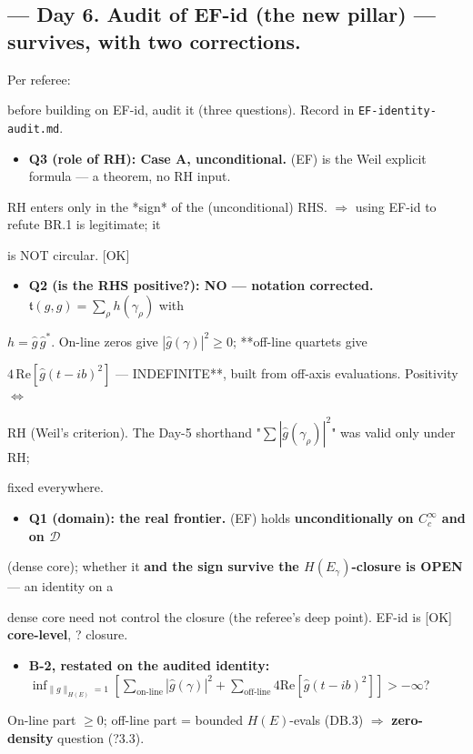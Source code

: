 \documentclass[10pt]{article}
\begin{document}
\subsection*{ --- Day 6. Audit of EF-id (the new pillar) --- survives, with two corrections.}
Per referee:\par
before building on EF-id, audit it (three questions). Record in \texttt{EF-identity-audit.md}.\par
\begin{itemize}
\item \textbf{Q3 (role of RH): Case A, unconditional.} (EF) is the Weil explicit formula --- a theorem, no RH input.
\end{itemize}
  RH enters only in the *sign* of the (unconditional) RHS. \ensuremath{\Rightarrow} using EF-id to refute BR.1 is legitimate; it\par
  is NOT circular. [OK]\par
\begin{itemize}
\item \textbf{Q2 (is the RHS positive?): NO --- notation corrected.} $\mathfrak t(g,g)=\sum_\rho h(\gamma_\rho)$ with
\end{itemize}
  $h=\widehat g\,\widehat g^*$. On-line zeros give $|\widehat g(\gamma)|^2\ge0$; **off-line quartets give\par
  $4\,\mathrm{Re}[\widehat g(t-ib)^2]$ --- INDEFINITE**, built from off-axis evaluations. Positivity $\iff$\par
  RH (Weil's criterion). The Day-5 shorthand "$\sum|\widehat g(\gamma_\rho)|^2$" was valid only under RH;\par
  fixed everywhere.\par
\begin{itemize}
\item \textbf{Q1 (domain): the real frontier.} (EF) holds \textbf{unconditionally on $C_c^\infty$ and on $\mathcal D$}
\end{itemize}
  (dense core); whether it \textbf{and the sign survive the $H(E_\gamma)$-closure is OPEN} --- an identity on a\par
  dense core need not control the closure (the referee's deep point). EF-id is [OK] \textbf{core-level}, ? closure.\par
\begin{itemize}
\item \textbf{B-2, restated on the audited identity:} $\inf_{\|g\|_{H(E)}=1}[\sum_{\text{on-line}}|\widehat g(\gamma)|^2+\sum_{\text{off-line}}4\mathrm{Re}[\widehat g(t-ib)^2]]>-\infty$?
\end{itemize}
  On-line part $\ge0$; off-line part = bounded $H(E)$-evals (DB.3) \ensuremath{\Rightarrow} \textbf{zero-density} question (?3.3).\par
\end{document}
